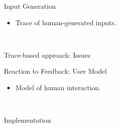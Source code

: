 \documentclass[aspectratio=1610]{beamer}
\begin{document}
\begin{frame}{Input Generation}
    \begin{itemize}
        \item Trace of human-generated inputs.
    \end{itemize}
    \begin{center}
        \\
    \end{center}
\end{frame}

\begin{frame}{Trace-based approach: Issues}
\end{frame}

\begin{frame}{Reaction to Feedback: User Model}
    \begin{itemize}
        \item Model of human interaction.
    \end{itemize}
    \begin{center}
        \\
        \vspace{.1\textheight}%
    \end{center}
\end{frame}

\begin{ssframe}{Implementation}
    \begin{center}
        
    \end{center}
\end{ssframe}
\end{document}
